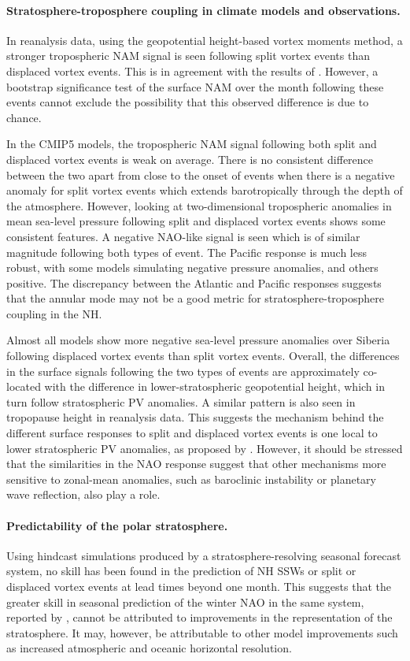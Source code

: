 \paragraph{Stratosphere-troposphere coupling in climate models and
  observations.}  In reanalysis data, using the geopotential height-based vortex
moments method, a stronger tropospheric NAM signal is seen following split
vortex events than displaced vortex events. This is in agreement with the
results of \citet{Mitchell2013}. However, a bootstrap significance test of the
surface NAM over the month following these events cannot exclude the possibility
that this observed difference is due to chance.

In the CMIP5 models, the tropospheric NAM signal following both split and
displaced vortex events is weak on average. There is no consistent difference
between the two apart from close to the onset of events when there is a negative
anomaly for split vortex events which extends barotropically through the depth
of the atmosphere. However, looking at two-dimensional tropospheric anomalies in
mean sea-level pressure following split and displaced vortex events shows some
consistent features. A negative NAO-like signal is seen which is of similar
magnitude following both types of event. The Pacific response is much less
robust, with some models simulating negative pressure anomalies, and others
positive. The discrepancy between the Atlantic and Pacific responses suggests
that the annular mode may not be a good metric for stratosphere-troposphere
coupling in the NH.

Almost all models show more negative sea-level pressure anomalies over Siberia
following displaced vortex events than split vortex events. Overall, the
differences in the surface signals following the two types of events are
approximately co-located with the difference in lower-stratospheric geopotential
height, which in turn follow stratospheric PV anomalies. A similar pattern is
also seen in tropopause height in reanalysis data. This suggests the mechanism
behind the different surface responses to split and displaced vortex events is
one local to lower stratospheric PV anomalies, as proposed by
\citet{Ambaum2002}. However, it should be stressed that the similarities in the
NAO response suggest that other mechanisms more sensitive to zonal-mean
anomalies, such as baroclinic instability or planetary wave reflection, also
play a role.

\paragraph{Predictability of the polar stratosphere.} Using hindcast simulations
produced by a stratosphere-resolving seasonal forecast system, no skill has been
found in the prediction of NH SSWs or split or displaced vortex events at lead
times beyond one month. This suggests that the greater skill in seasonal
prediction of the winter NAO in the same system, reported by \citet{Scaife2013},
cannot be attributed to improvements in the representation of the
stratosphere. It may, however, be attributable to other model improvements such
as increased atmospheric and oceanic horizontal resolution.

